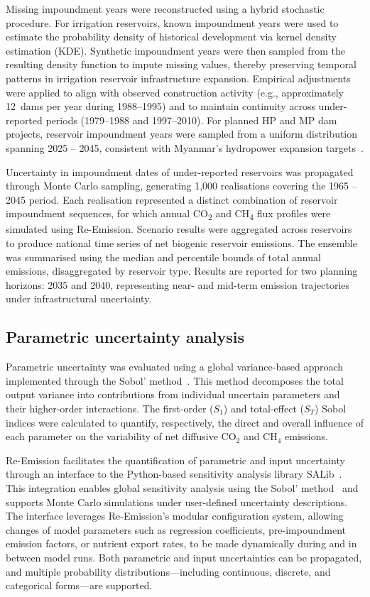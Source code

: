 \documentclass[review, authoryear, 1p]{elsarticle} %
\begin{document}
Missing impoundment years were reconstructed using a hybrid stochastic procedure.
For irrigation reservoirs, known impoundment years were used to estimate the probability density of historical development via kernel density estimation (\acs{KDE}).
Synthetic impoundment years were then sampled from the resulting density function to impute missing values, thereby preserving temporal patterns in irrigation reservoir infrastructure expansion.
Empirical adjustments were applied to align with observed construction activity (e.g., approximately 12~dams per year during 1988--1995) and to maintain continuity across under-reported periods (1979--1988 and 1997--2010).
For planned \ac{HP} and \ac{MP} dam projects, reservoir impoundment years were sampled from a uniform distribution spanning 2025 -- 2045, consistent with Myanmar’s hydropower expansion targets~\citep{Aung2020}.

Uncertainty in impoundment dates of under-reported reservoirs was propagated through Monte Carlo sampling, generating 1,000 realisations covering the 1965 -- 2045 period.
Each realisation represented a distinct combination of reservoir impoundment sequences, for which annual CO\textsubscript{2} and CH\textsubscript{4} flux profiles were simulated using Re-Emission.
Scenario results were aggregated across reservoirs to produce national time series of net biogenic reservoir emissions.
The ensemble was summarised using the median and percentile bounds of total annual emissions, disaggregated by reservoir type.
Results are reported for two planning horizons: 2035 and 2040, representing near- and mid-term emission trajectories under infrastructural uncertainty.

\subsection{Parametric uncertainty analysis}

Parametric uncertainty was evaluated using a global variance-based approach implemented through the Sobol' method~\citep{Sobol2001}. 
This method decomposes the total output variance into contributions from individual uncertain parameters and their higher-order interactions.
The first-order ($S_1$) and total-effect ($S_T$) Sobol indices were calculated to quantify, respectively, the direct and overall influence of each parameter on the variability of net diffusive CO$_2$ and CH$_4$ emissions.

Re-Emission facilitates the quantification of parametric and input uncertainty through an interface to the Python-based sensitivity analysis library {SALib}~\citep{Iwanaga_Toward_SALib_2_0_2022}. 
This integration enables global sensitivity analysis using the Sobol' method~\citep{Sobol2001, Saltelli2002} and supports Monte Carlo simulations under user-defined uncertainty descriptions. 
The interface leverages Re-Emission's modular configuration system, allowing changes of model parameters such as regression coefficients, pre-impoundment emission factors, or nutrient export rates, to be made dynamically during and in between model runs. 
Both parametric and input uncertainties can be propagated, and multiple probability distributions---including continuous, discrete, and categorical forms---are supported.
\end{document}
